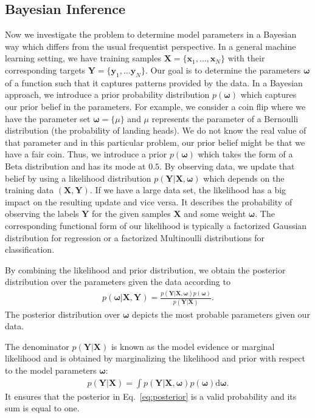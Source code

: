 \documentclass[runningheads]{llncs}
\begin{document}
\subsection{Bayesian Inference}
\label{sec:bayesian_inference}
Now we investigate the problem to determine model parameters in a Bayesian way which differs from the usual frequentist perspective.
In a general machine learning setting, we have training samples $\mathbf{X} = \{\mathbf{x}_1, \dots,  \mathbf{x}_N\}$ with their corresponding targets $\mathbf{Y} = \{\mathbf{y}_1, \dots  \mathbf{y}_N\}$. 
Our goal is to determine the parameters $\boldsymbol{\omega}$ of a function such that it captures patterns provided by the data.
In a Bayesian approach, we introduce a prior probability distribution $p(\boldsymbol{\omega})$ which captures our prior belief in the parameters.
For example, we consider a coin flip where we have the parameter set $\boldsymbol{\omega} = \{\mu\}$ and $\mu$ represents the parameter of a Bernoulli distribution (the probability of landing heads).
We do not know the real value of that parameter and in this particular problem, our prior belief might be that we have a fair coin. 
Thus, we introduce a prior $p(\boldsymbol{\omega})$ which takes the form of a $\mathrm{Beta}$ distribution and has its mode at $0.5$.
By observing data, we update that belief by using a likelihood distribution $p\left(\mathbf{Y} | \mathbf{X}, \boldsymbol{\omega} \right)$ which depends on the training data $\left(\mathbf{X}, \mathbf{Y}\right)$. 
If we have a large data set, the likelihood has a big impact on the resulting update and vice versa.
It describes the probability of observing the labels $\mathbf{Y}$ for the given samples $\mathbf{X}$ and some weight $\boldsymbol{\omega}$. 
The corresponding functional form of our likelihood is typically a factorized Gaussian distribution for regression or a factorized Multinoulli distributions for classification.

By combining the likelihood and prior distribution, we obtain the posterior distribution over the parameters given the data according to 
\begin{align}
    p\left(\boldsymbol{\omega} | \mathbf{X}, \mathbf{Y} \right) = \frac{p(\mathbf{Y} | \mathbf{X}, \boldsymbol{\omega})p\left(\boldsymbol{\omega}\right)}{p\left(\mathbf{Y} | \mathbf{X}\right)}.\label{eq:posterior}
\end{align}
The posterior distribution over $\boldsymbol{\omega}$ depicts the most probable parameters given our data.


The denominator $p\left(\mathbf{Y}|\mathbf{X}\right)$ is known as the model evidence or marginal likelihood and is obtained by marginalizing the likelihood and prior with respect to the model parameters $\boldsymbol{\omega}$:
\begin{align}
    p(\mathbf{Y} | \mathbf{X}) = \int p(\mathbf{Y} | \mathbf{X}, \boldsymbol{\omega})p\left(\boldsymbol{\omega}\right) \text{d}\boldsymbol{\omega}\label{eq:model_evidence}.
\end{align}
It ensures that the posterior in Eq.~\ref{eq:posterior} is a valid probability and its sum is equal to one.
\end{document}
